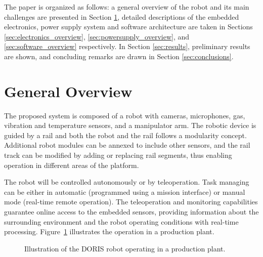 \documentclass{ifacconf}
\begin{document}
The paper is organized as follows: a general overview of the robot and its main
challenges are presented in Section \ref{sec:general_overview}, detailed
descriptions of the embedded electronics, power
supply system and software architecture are taken in Sections
\ref{sec:electronics_overview}, \ref{sec:powersupply_overview}, and
\ref{sec:software_overview} respectively.
In Section \ref{sec:results}, preliminary results are shown, and concluding
remarks are drawn in Section \ref{sec:conclusions}. 

\section{General Overview}\label{sec:general_overview}

The proposed system is composed of a robot with cameras, microphones, gas,
vibration and temperature sensors, and a manipulator arm. The robotic device is
guided by a rail and both the robot and the rail follows a modularity concept.
Additional robot modules can be annexed to include other sensors, and the rail
track can be modified by adding or replacing rail segments, thus enabling
operation in different areas of the platform.

The robot will be controlled autonomously or by teleoperation. Task managing
can be either in automatic (programmed using a mission interface) or manual
mode (real-time remote operation). The teleoperation and monitoring
capabilities guarantee online access to the embedded sensors, providing
information about the surrounding environment and the robot operating
conditions with real-time processing. Figure~\ref{fig:DORIS-overview}
illustrates the operation in a production plant.

\begin{figure}[ht] 
\centering
{} 
\vspace{-.1cm}
\caption{Illustration of the DORIS robot operating in a production plant.}\vspace{-0.25cm}
\label{fig:DORIS-overview}
\end{figure}
\end{document}
